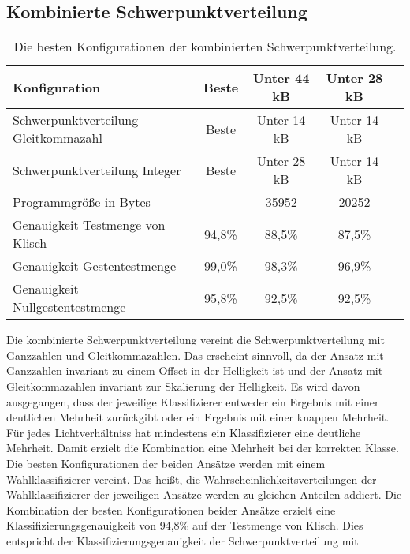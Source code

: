 \subsection{Kombinierte Schwerpunktverteilung}
\begin{table}[h!]
    \centering
    \begin{tabular}{ | l | c | c | c | c |}
        \hline
        Konfiguration & Beste & Unter 44 kB & Unter 28 kB \\\hline
        Schwerpunktverteilung Gleitkommazahl & Beste & Unter 14 kB & Unter 14 kB \\\hline
        Schwerpunktverteilung Integer & Beste &  Unter 28 kB & Unter 14 kB \\\hline
        Programmgröße in Bytes & - & 35952 & 20252 \\\hline
        Genauigkeit Testmenge von Klisch & 94,8\% & 88,5\% & 87,5\% \\\hline
        Genauigkeit Gestentestmenge & 99,0\% & 98,3\% & 96,9\% \\\hline
        Genauigkeit Nullgestentestmenge & 95,8\% & 92,5\% & 92,5\% \\\hline
    \end{tabular}
    \caption{Die besten Konfigurationen der kombinierten Schwerpunktverteilung.}
    \label{tab:schwerpunktverteilung_int_and_float}
\end{table}
Die kombinierte Schwerpunktverteilung vereint die Schwerpunktverteilung mit Ganzzahlen und Gleitkommazahlen. Das erscheint sinnvoll, da der Ansatz mit Ganzzahlen invariant zu einem Offset in der
Helligkeit ist und der Ansatz mit Gleitkommazahlen invariant zur Skalierung der Helligkeit.
\newline
\newline
Es wird davon ausgegangen, dass der jeweilige Klassifizierer entweder ein Ergebnis mit einer deutlichen Mehrheit zurückgibt oder ein Ergebnis mit einer knappen Mehrheit. Für jedes Lichtverhältniss hat mindestens ein
Klassifizierer eine deutliche Mehrheit. Damit erzielt die Kombination eine Mehrheit bei der korrekten Klasse. Die besten Konfigurationen der beiden Ansätze werden mit einem Wahlklassifizierer vereint.
Das heißt, die Wahrscheinlichkeitsverteilungen der Wahlklassifizierer der jeweiligen Ansätze werden zu gleichen Anteilen addiert.
\newline
\newline
Die Kombination der besten Konfigurationen beider Ansätze erzielt eine Klassifizierungsgenauigkeit von 94,8\% auf der Testmenge von Klisch. Dies entspricht der Klassifizierungsgenauigkeit der Schwerpunktverteilung mit
